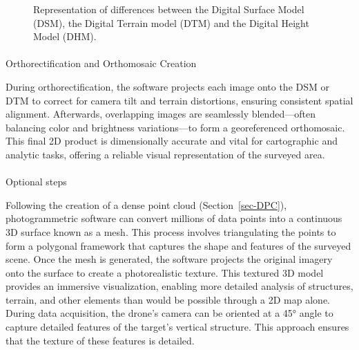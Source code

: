\documentclass[
  letterpaper,
  11pt,
  english,
  singlespacing,
  headsepline]{MastersDoctoralThesis}
\makeatletter
\let\oldparagraph\paragraph
\renewcommand{\paragraph}{
    \@ifstar
      \xxxParagraphStar
      \xxxParagraphNoStar
  }
\newcommand{\xxxParagraphStar}[1]{\oldparagraph*{#1}\mbox{}}
\newcommand{\xxxParagraphNoStar}[1]{\oldparagraph{#1}\mbox{}}
\makeatother
\begin{document}
\begin{spacing}{1.5}
\begin{figure}

\caption{\label{fig-DSMDTM}Representation of differences between the
Digital Surface Model (DSM), the Digital Terrain model (DTM) and the
Digital Height Model (DHM).}

\end{figure}%

\paragraph{Orthorectification and Orthomosaic
Creation}\label{orthorectification-and-orthomosaic-creation}

During orthorectification, the software projects each image onto the DSM
or DTM to correct for camera tilt and terrain distortions, ensuring
consistent spatial alignment. Afterwards, overlapping images are
seamlessly blended---often balancing color and brightness
variations---to form a georeferenced orthomosaic. This final 2D product
is dimensionally accurate and vital for cartographic and analytic tasks,
offering a reliable visual representation of the surveyed area.

\paragraph{Optional steps}\label{optional-steps}

Following the creation of a dense point cloud (Section~\ref{sec-DPC}),
photogrammetric software can convert millions of data points into a
continuous 3D surface known as a mesh. This process involves
triangulating the points to form a polygonal framework that captures the
shape and features of the surveyed scene. Once the mesh is generated,
the software projects the original imagery onto the surface to create a
photorealistic texture. This textured 3D model provides an immersive
visualization, enabling more detailed analysis of structures, terrain,
and other elements than would be possible through a 2D map alone. During
data acquisition, the drone's camera can be oriented at a 45° angle to
capture detailed features of the target's vertical structure. This
approach ensures that the texture of these features is detailed.


\end{spacing}
\end{document}

